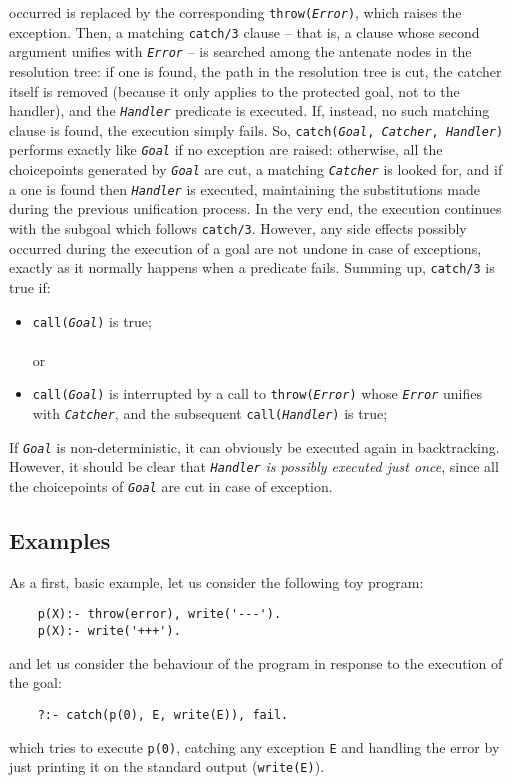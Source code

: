 occurred is replaced by the corresponding \texttt{throw(\textit{Error})}, which raises the
exception. Then, a matching \texttt{catch/3} clause -- that is, a clause whose second argument
unifies with \texttt{\textit{Error}} -- is searched among the antenate nodes in the resolution
tree: if one is found, the path in the resolution tree is cut, the catcher itself is removed
(because it only applies to the protected goal, not to the handler), and the
\texttt{\textit{Handler}} predicate is executed. If, instead, no such matching clause is found,
the execution simply fails.
%
So, \texttt{catch(\textit{Goal}, \textit{Catcher}, \textit{Handler})} performs exactly like
\texttt{\textit{Goal}} if no exception are raised: otherwise, all the choicepoints generated by
\texttt{\textit{Goal}} are cut, a matching \texttt{\textit{Catcher}} is looked for, and if a one
is found then \texttt{\textit{Handler}} is executed, maintaining the substitutions made during the
previous unification process.
%
In the very end, the execution continues with the subgoal which follows \texttt{catch/3}.
%
However, any side effects possibly occurred during the execution of a goal are not undone in case
of exceptions, exactly as it normally happens when a predicate fails.
%
Summing up, \texttt{catch/3} is true if:
\begin{itemize}
  \item \texttt{call(\textit{Goal})} is true;\\\\or
  \item \texttt{call(\textit{Goal})} is interrupted by a call to
      \texttt{throw(\textit{Error})} whose \texttt{\textit{Error}} unifies with
      \texttt{\textit{Catcher}}, and the subsequent \texttt{call(\textit{Handler})} is true;
\end{itemize}

If \texttt{\textit{Goal}} is non-deterministic, it can obviously be executed again in
backtracking. However, it should be clear that \texttt{\textit{Handler}} \textit{is possibly
executed just once}, since all the choicepoints of \texttt{\textit{Goal}} are cut in case of
exception.

\subsection{Examples}\label{ssec:basic examples}
As a first, basic example, let us consider the following toy program:
\begin{verbatim}
    p(X):- throw(error), write('---').
    p(X):- write('+++').
\end{verbatim}
and let us consider the behaviour of the program in response to the execution of the goal:
\begin{verbatim}
    ?:- catch(p(0), E, write(E)), fail.
\end{verbatim}
which tries to execute \texttt{p(0)}, catching any exception \texttt{E} and handling the error by
just printing it on the standard output (\texttt{write(E)}).

